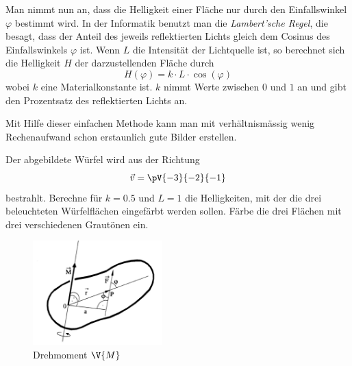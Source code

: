 \documentclass[%
11pt,%
twoside,%
titlepage,%
german,%
headsepline%
]{scrartcl}
\theoremstyle{definition}
\theoremstyle{plain}
\begin{document}
Man nimmt nun an, dass die Helligkeit einer Fläche nur durch den Einfallswinkel $\varphi$ bestimmt wird. In der Informatik benutzt man die \emph{Lambert'sche Regel}, die besagt, dass der Anteil des jeweils reflektierten Lichts gleich dem Cosinus des Einfallswinkels $\varphi$ ist.
Wenn $L$ die Intensität der Lichtquelle ist, so berechnet sich die Helligkeit $H$ der darzustellenden Fläche durch
$$H(\varphi)=k\cdot L\cdot\cos(\varphi)$$
wobei $k$ eine Materialkonstante ist. $k$ nimmt Werte zwischen $0$ und $1$ an und gibt den Prozentsatz des reflektierten Lichts an.

Mit Hilfe dieser einfachen Methode kann man mit verhältnismässig wenig Rechenaufwand schon erstaunlich gute Bilder erstellen.

\begin{ueb}[Lambert]
Der abgebildete Würfel wird aus der Richtung
$$\vec{v}=\pV{-3}{-2}{-1}$$
bestrahlt. Berechne für $k=0.5$ und $L=1$ die Helligkeiten, mit der die drei beleuchteten Würfelflächen eingefärbt werden sollen. Färbe die drei Flächen mit drei verschiedenen Grautönen ein.
\begin{center}
\end{center}
\end{ueb}

\begin{figure}[ht]
\begin{center}
\includegraphics[width=5cm]{pictures/vprodukt}
\end{center}
\caption{Drehmoment $\V{M}$}\label{abb:vektorprod}
\end{figure}
\end{document}
